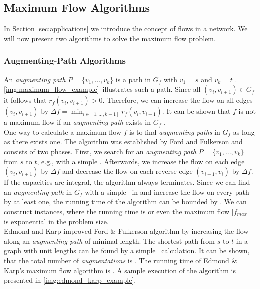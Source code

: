 
\subsection{Maximum Flow Algorithms}
\label{sec:max_flow}

In Section \ref{sec:applications} we introduce the concept of flows in a network. We
will now present two algorithms to solve the maximum flow problem.

\subsubsection{Augmenting-Path Algorithms}
\label{sec:aug_path}

An \emph{augmenting path} $P = \{v_1,\ldots,v_k\}$ is a path in $G_f$ with $v_1 = s$ and 
$v_k = t$ \cite{edmonds1972theoretical}. \autoref{img:maximum_flow_example}~illustrates such a path.
Since all $(v_i,v_{i+1}) \in G_f$ it follows that $r_f(v_i,v_{i+1}) > 0$. 
Therefore, we can increase the flow on all edges $(v_i,v_{i+1})$ by 
$\Delta f = \min_{i \in [1,\ldots,k-1]} r_f(v_i,v_{i+1})$. It can be shown that $f$ is not a
maximum flow if an \emph{augmenting path} exists in $G_f$ \cite{edmonds1972theoretical}. \\
One way to calculate a maximum flow $f$ is to find \emph{augmenting paths} in $G_f$ as
long as there exists one. The algorithm was established by Ford and Fulkerson \cite{ford1956maximal} and
consists of two phases. First, we search for an \emph{augmenting path} $P = \{v_1,\ldots,v_k\}$
from $s$ to $t$, e.g., with a simple \DFS. Afterwards, we increase the flow on each
edge $(v_i,v_{i+1})$ by $\Delta f$ and decrease the flow on each reverse edge $(v_{i+1},v_i)$
by $\Delta f$. If the capacities are integral, the algorithm always terminates. Since we can find an \emph{augmenting
path} in $G_f$ with a simple \DFS~in  and increase the
flow on every path by at least one, the running time of the algorithm can be bounded by .
We can construct instances, where the running time is  or even the maximum flow $|f_{max}|$ 
is exponential in the problem size. \\
Edmond and Karp \cite{edmonds1972theoretical} improved Ford \& Fulkerson algorithm by increasing the flow
along an \emph{augmenting path} of minimal length. The shortest path from $s$ to $t$ in a 
graph with unit lengths can be found by a simple \BFS~calculation. It can be shown, that the
total number of \emph{augmentations} is . The running time of Edmond \& Karp's
maximum flow algorithm is . A sample execution of the algorithm
is presented in \autoref{img:edmond_karp_example}.


